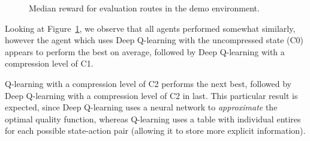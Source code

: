 \documentclass[a4paper]{report}
\begin{document}
\begin{figure}[H]
  \centering
  \caption{Median reward for evaluation routes in the demo environment.}
  \label{fig:compressed_q_learning_demo_eval_3}
\end{figure}

Looking at Figure~\ref{fig:compressed_q_learning_demo_eval_3}, we observe that all agents performed somewhat similarly, however the agent which uses Deep Q-learning with the uncompressed state (C0) appears to perform the best on average, followed by Deep Q-learning with a compression level of C1.

Q-learning with a compression level of C2 performs the next best, followed by Deep Q-learning with a compression level of C2 in last. This particular result is expected, since Deep Q-learning uses a neural network to \emph{approximate} the optimal quality function, whereas Q-learning uses a table with individual entires for each possible state-action pair (allowing it to store more explicit information).
\end{document}
